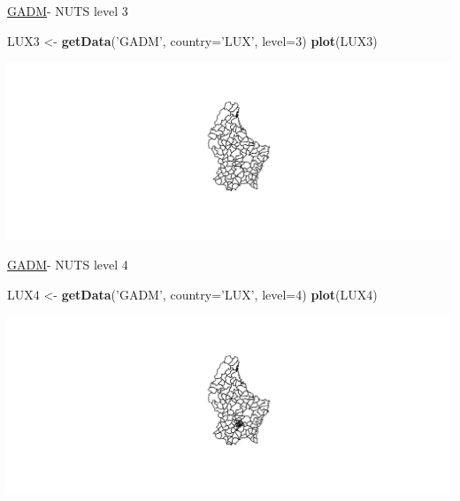 \documentclass[ignorenonframetext,]{beamer}
\newenvironment{Shaded}{\begin{snugshade}}{\end{snugshade}}
\newcommand{\DataTypeTok}[1]{\textcolor[rgb]{0.13,0.29,0.53}{#1}}
\newcommand{\DecValTok}[1]{\textcolor[rgb]{0.00,0.00,0.81}{#1}}
\newcommand{\KeywordTok}[1]{\textcolor[rgb]{0.13,0.29,0.53}{\textbf{#1}}}
\newcommand{\NormalTok}[1]{#1}
\newcommand{\StringTok}[1]{\textcolor[rgb]{0.31,0.60,0.02}{#1}}
\begin{document}
\begin{frame}[fragile]{\href{http://www.gadm.org/}{GADM}- NUTS level 3}
\protect\hypertarget{gadm--nuts-level-3}{}

\begin{Shaded}
\begin{Highlighting}[]
\NormalTok{LUX3 <-}\StringTok{ }\KeywordTok{getData}\NormalTok{(}\StringTok{'GADM'}\NormalTok{, }\DataTypeTok{country=}\StringTok{'LUX'}\NormalTok{, }\DataTypeTok{level=}\DecValTok{3}\NormalTok{)}
\KeywordTok{plot}\NormalTok{(LUX3)}
\end{Highlighting}
\end{Shaded}

\includegraphics{shapefiles_files/figure-beamer/LUX3-1.pdf}

\end{frame}

\begin{frame}[fragile]{\href{http://www.gadm.org/}{GADM}- NUTS level 4}
\protect\hypertarget{gadm--nuts-level-4}{}

\begin{Shaded}
\begin{Highlighting}[]
\NormalTok{LUX4 <-}\StringTok{ }\KeywordTok{getData}\NormalTok{(}\StringTok{'GADM'}\NormalTok{, }\DataTypeTok{country=}\StringTok{'LUX'}\NormalTok{, }\DataTypeTok{level=}\DecValTok{4}\NormalTok{)}
\KeywordTok{plot}\NormalTok{(LUX4)}
\end{Highlighting}
\end{Shaded}

\includegraphics{shapefiles_files/figure-beamer/LUX4-1.pdf}

\end{frame}
\end{document}
